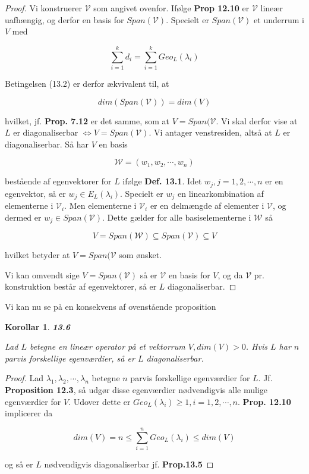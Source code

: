 \documentclass[paper=a4, fontsize=11pt]{scrartcl} %
\newtheorem*{korollar}{Korollar}
\newenvironment{cstmkorollar}[1]{\begin{korollar} {\normalfont\textbf{#1}}}{\end{korollar}}
\begin{document}
	
	\begin{proof}
		
		Vi konstruerer $\mathcal{V}$ som angivet ovenfor. Ifølge \textbf{Prop 12.10} er $\mathcal{V}$ lineær uafhængig, og derfor en basis for $Span(\mathcal{V})$. Specielt er $Span(\mathcal{V})$ et underrum i $V$ med
		
		\[\sum_{i=1}^k d_i = \sum_{i=1}^k Geo_L(\lambda_i)\]
		
		Betingelsen (13.2) er derfor ækvivalent til, at 
		
		\[dim(Span(\mathcal{V})) = dim(V)\]
		
		hvilket, jf. \textbf{Prop. 7.12} er det samme, som at $V = Span(\mathcal{V}$. Vi skal derfor vise at $L$ er diagonaliserbar $\Leftrightarrow V = Span(\mathcal{V})$. Vi antager venstresiden, altså at $L$ er diagonaliserbar. Så har $V$ en basis
		
		\[\mathcal{W} = (w_1,w_2,\cdots,w_n)\]
		
		bestående af egenvektorer for $L$ ifølge \textbf{Def. 13.1}. Idet $w_j, j = 1,2,\cdots,n$ er en egenvektor,  så er $w_j \in E_L(\lambda_i)$. Specielt er $w_j$ en linearkombination af elementerne i $\mathcal{V}_i$. Men elementerne i $\mathcal{V}_i$ er en delmængde af elementer i $\mathcal{V}$, og dermed er $w_j \in Span(\mathcal{V})$. Dette gælder for alle basiselementerne i $\mathcal{W}$ så
		
		\[V = Span(\mathcal{W}) \subseteq Span(\mathcal{V}) \subseteq V\]
		
		hvilket betyder at $V = Span(\mathcal{V}$ som ønsket.
		
		Vi kan omvendt sige $V = Span(\mathcal{V})$ så er $\mathcal{V}$ en basis for $V$, og da $\mathcal{V}$ pr. konstruktion består af egenvektorer, så er $L$ diagonaliserbar.
		
	\end{proof}
	
	Vi kan nu se på en konsekvens af ovenstående proposition
	
	\begin{cstmkorollar}{13.6}
		
		Lad $L$ betegne en lineær operator på et vektorrum $V, dim(V) > 0$. Hvis $L$ har $n$ parvis forskellige egenværdier, så er $L$ diagonaliserbar. 
		
	\end{cstmkorollar}
	
	
	\begin{proof}
		
		Lad $\lambda_1,\lambda_2,\cdots,\lambda_n$ betegne $n$ parvis forskellige egenværdier for $L$. Jf. \textbf{Proposition 12.3}, så udgør disse egenværdier nødvendigvis alle mulige egenværdier for $V$. Udover dette er $Geo_L(\lambda_i) \geq 1, i = 1,2,\cdots,n$. \textbf{Prop. 12.10} implicerer da
		
		\[dim(V) = n \leq \sum_{i=1}^n Geo_L(\lambda_i) \leq dim(V)\]
		
		og så er $L$ nødvendigvis diagonaliserbar jf. \textbf{Prop.13.5}
		
	\end{proof}
	
\end{document}
